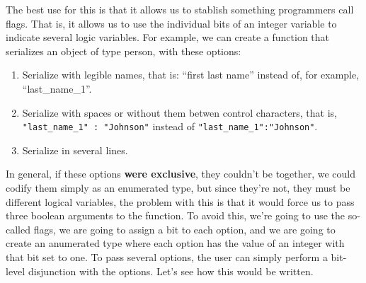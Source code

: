 \documentclass[a4paper]{article}
\begin{document}
The best use for this is that it allows us to stablish something programmers
call flags. That is, it allows us to use the individual bits of an integer
variable to indicate several logic variables. For example, we can create a
function that serializes an object of type person, with these options:
\begin{enumerate}
\item Serialize with legible names, that is: ``first last name'' instead of,
for example, ``last\_name\_1''.
\item Serialize with spaces or without them betwen control characters, that is,
\verb!"last_name_1" : "Johnson"! instead of \verb!"last_name_1":"Johnson"!.
\item Serialize in several lines.
\end{enumerate}

In general, if these options \textbf{were exclusive}, they couldn't be together,
we could codify them simply as an enumerated type, but since they're not, they
must be different logical variables, the problem with this is that it would
force us to pass three boolean arguments to the function. To avoid this, we're
going to use the so-called flags, we are going to assign a bit to each option,
and we are going to create an anumerated type where each option has the value
of an integer with that bit set to one. To pass several options, the user
can simply perform a bit-level disjunction with the options. Let's see how this
would be written.
\end{document}
